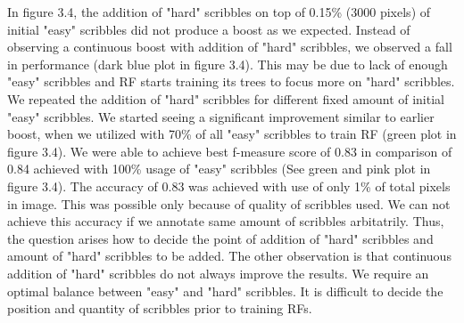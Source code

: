 In figure 3.4, the addition of "hard" scribbles on top of 0.15\% (3000 pixels) of initial "easy" scribbles did not produce a boost as we expected. Instead of observing a continuous boost with addition of "hard" scribbles, we observed a fall in performance (dark blue plot in figure 3.4). This may be due to lack of enough "easy" scribbles and RF starts training its trees to focus more on "hard" scribbles. We repeated the addition of "hard" scribbles for different fixed amount of initial "easy" scribbles. We started seeing a significant improvement similar to earlier boost, when we utilized with 70\% of all "easy" scribbles to train RF (green plot in figure 3.4). We were able to achieve best f-measure score of 0.83 in comparison of 0.84 achieved with 100\% usage of "easy" scribbles (See green and pink plot in figure 3.4). The accuracy of 0.83 was achieved with use of only 1\% of total pixels in image. This was possible only because of quality of scribbles used. We can not achieve this accuracy if we annotate same amount of scribbles arbitatrily. Thus, the question arises how to decide the point of addition of "hard" scribbles and amount of "hard" scribbles to be added. The other observation is that continuous addition of "hard" scribbles do not always improve the results. We require an optimal balance between "easy" and "hard" scribbles. It is difficult to decide the position and quantity of scribbles prior to training RFs. 

